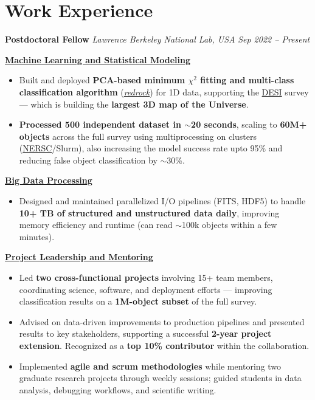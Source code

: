 \documentclass[a4paper,10pt]{article}
\begin{document}
\section*{Work Experience}
\textcolor{sectionblue}{\textbf{Postdoctoral Fellow}} \hfill 
\textcolor{sectionblue}{\textit{Lawrence Berkeley National Lab, USA}} \hfill 
\textcolor{sectionblue}{\textit{Sep 2022 – Present}}
\vspace{1.5mm}
\begin{adjustwidth}{1em}{0pt}

\textbf{\textcolor{sectionblue}{\underline{Machine Learning and Statistical Modeling}}}
\begin{itemize}[leftmargin=*, itemsep=2pt]
    \item Built and deployed \textbf{PCA-based minimum $\chi^2$ fitting and multi-class classification algorithm} (\href{https://github.com/desihub/redrock}{\textit{redrock}}) for 1D data, supporting the \href{https://en.wikipedia.org/wiki/Dark_Energy_Spectroscopic_Instrument}{DESI} survey — which is building the \textbf{largest 3D map of the Universe}.
    \vspace{-0.5mm}
    \item \textbf{Processed 500 independent dataset in $\sim$20 seconds}, scaling to \textbf{60M+ objects} across the full survey using multiprocessing on clusters (\href{https://www.nersc.gov/}{NERSC}/Slurm), also increasing the model success rate upto 95\% and reducing false object classification by $\sim$30\%.
\end{itemize}
\vspace{-1pt}
\textcolor{sectionblue}{\textbf{\underline{Big Data Processing}}}
\begin{itemize}[leftmargin=*, itemsep=2pt]
    \item Designed and maintained parallelized I/O pipelines (FITS, HDF5) to handle \textbf{10+ TB of structured and unstructured data daily}, improving memory efficiency and runtime (can read $\sim$100k objects within a few minutes).
\end{itemize}
\vspace{-0.5pt}
\textcolor{sectionblue}{\textbf{\underline{Project Leadership and Mentoring}}}
\begin{itemize}[leftmargin=*, itemsep=2pt]
    \item Led \textbf{two cross-functional projects} involving 15+ team members, coordinating science, software, and deployment efforts — improving classification results on a \textbf{1M-object subset} of the full survey.
     \vspace{-0.5mm}
    \item Advised on data-driven improvements to production pipelines and presented results to key stakeholders, supporting a successful \textbf{2-year project extension}. Recognized as a \textbf{top 10\% contributor} within the collaboration.
    \item Implemented \textbf{agile and scrum methodologies} while mentoring two graduate research projects through weekly sessions; guided students in data analysis, debugging workflows, and scientific writing.

\end{itemize}
\end{adjustwidth}
\end{document}
